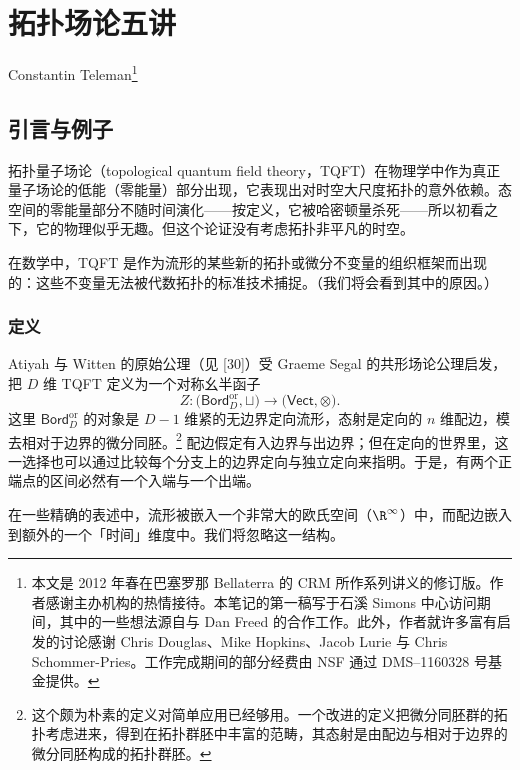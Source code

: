 \chapter{拓扑场论五讲}
\label{chap:03}

\noindent Constantin Teleman\footnote{本文是 2012 年春在巴塞罗那 Bellaterra 的 CRM 所作系列讲义的修订版。作者感谢主办机构的热情接待。本笔记的第一稿写于石溪 Simons 中心访问期间，其中的一些想法源自与 Dan Freed 的合作工作。此外，作者就许多富有启发的讨论感谢 Chris Douglas、Mike Hopkins、Jacob Lurie 与 Chris Schommer-Pries。工作完成期间的部分经费由 NSF 通过 DMS--1160328 号基金提供。}

\section{引言与例子}

拓扑量子场论（topological quantum field theory，TQFT）在物理学中作为真正量子场论的低能（零能量）部分出现，它表现出对时空大尺度拓扑的意外依赖。态空间的零能量部分不随时间演化——按定义，它被哈密顿量杀死——所以初看之下，它的物理似乎无趣。但这个论证没有考虑拓扑非平凡的时空。

在数学中，TQFT 是作为流形的某些新的拓扑或微分不变量的组织框架而出现的：这些不变量无法被代数拓扑的标准技术捕捉。（我们将会看到其中的原因。）

\subsection{定义}

Atiyah 与 Witten 的原始公理（见 [30]）受 Graeme Segal 的共形场论公理启发，把 $D$ 维 TQFT 定义为一个对称幺半函子
\[
Z\colon\bigl(\mathsf{Bord}^{\mathrm{or}}_D,\sqcup\bigr)\longrightarrow\bigl(\mathsf{Vect},\otimes\bigr).
\]
这里 $\mathsf{Bord}^{\mathrm{or}}_D$ 的对象是 $D-1$ 维紧的无边界定向流形，态射是定向的 $n$ 维配边，模去相对于边界的微分同胚。\footnote{这个颇为朴素的定义对简单应用已经够用。一个改进的定义把微分同胚群的拓扑考虑进来，得到在拓扑群胚中丰富的范畴，其态射是由配边与相对于边界的微分同胚构成的拓扑群胚。} 配边假定有入边界与出边界；但在定向的世界里，这一选择也可以通过比较每个分支上的边界定向与独立定向来指明。于是，有两个正端点的区间必然有一个入端与一个出端。

\begin{remark}
在一些精确的表述中，流形被嵌入一个非常大的欧氏空间（$\R^\infty$）中，而配边嵌入到额外的一个「时间」维度中。我们将忽略这一结构。
\end{remark}

